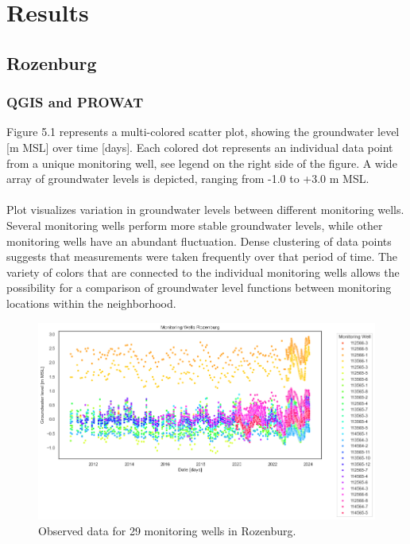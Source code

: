 \chapter{Results}
\label{chapter:results}


\section{Rozenburg}
\subsection{QGIS and PROWAT}

Figure 5.1 represents a multi-colored scatter plot, showing the groundwater level [m MSL] over time [days]. Each colored dot represents an individual data point from a unique monitoring well, see legend on the right side of the figure. A wide array of groundwater levels is depicted, ranging from -1.0 to +3.0 m MSL. \\
\\
Plot  visualizes variation in groundwater levels between different monitoring wells. Several monitoring wells perform more stable groundwater levels, while other monitoring wells have an abundant fluctuation. Dense clustering of data points suggests that measurements were taken frequently over that period of time. The variety of colors that are connected to the individual monitoring wells allows the possibility for a comparison of groundwater level functions between monitoring locations within the neighborhood. \\
\begin{figure}[h]
    \centering
    \includegraphics[width=0.80\linewidth]{frontmatter/Rozenburg-fig/rozscatter.png}
    \caption{Observed data for 29 monitoring wells in Rozenburg.}
    \label{beforeroz}
\end{figure}\\


